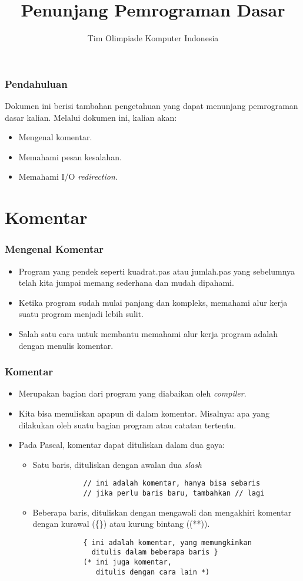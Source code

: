 \documentclass{beamer}
\title{Penunjang Pemrograman Dasar}
\author{Tim Olimpiade Komputer Indonesia}
\begin{document}
\begin{frame}
\titlepage
\end{frame}

\begin{frame}
\frametitle{Pendahuluan}
Dokumen ini berisi tambahan pengetahuan yang dapat menunjang pemrograman dasar kalian.
\vfill
Melalui dokumen ini, kalian akan:
\begin{itemize}
	\item Mengenal komentar.
	\item Memahami pesan kesalahan.
	\item Memahami I/O \textit{redirection}.
\end{itemize}
\end{frame}

\section{Komentar}
\frame{\sectionpage}

\begin{frame}
\frametitle{Mengenal Komentar}
\begin{itemize}
	\item Program yang pendek seperti kuadrat.pas atau jumlah.pas yang sebelumnya telah kita jumpai memang sederhana dan mudah dipahami.
	\item Ketika program sudah mulai panjang dan kompleks, memahami alur kerja suatu program menjadi lebih sulit.
	\item Salah satu cara untuk membantu memahami alur kerja program adalah dengan menulis komentar.
\end{itemize}
\end{frame}

\begin{frame}[fragile]
\frametitle{Komentar}
\begin{itemize}
	\item Merupakan bagian dari program yang diabaikan oleh \textit{compiler}.
	\item Kita bisa menuliskan apapun di dalam komentar. Misalnya: apa yang dilakukan oleh suatu bagian program atau catatan tertentu.
	\item Pada Pascal, komentar dapat dituliskan dalam dua gaya:
	\begin{itemize}
		\item Satu baris, dituliskan dengan awalan dua \textit{slash}
		\begin{lstlisting}
			// ini adalah komentar, hanya bisa sebaris
			// jika perlu baris baru, tambahkan // lagi
		\end{lstlisting}
		\item Beberapa baris, dituliskan dengan mengawali dan mengakhiri komentar dengan kurawal (\{\}) atau kurung bintang ((**)). 
		\begin{lstlisting}
			{ ini adalah komentar, yang memungkinkan 
			  ditulis dalam beberapa baris }
			(* ini juga komentar, 
			   ditulis dengan cara lain *)
		\end{lstlisting}
	\end{itemize}
\end{itemize}
\end{frame}
\end{document}
